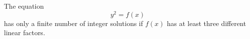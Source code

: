 \begin{proposition}
    The equation
\[
    y^2=f(x)
\]
    has only a finite number of integer solutions if $f(x)$ has at least three different linear factors.
\end{proposition}
